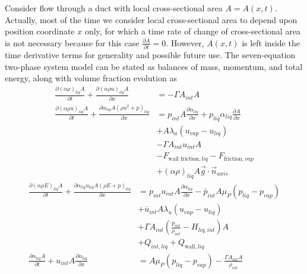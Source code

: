 Consider flow through a duct with local cross-sectional area
$A=A(x,t)$.  Actually, most of the time we consider local
cross-sectional area to depend upon position coordinate $x$ only,
for which a time rate of change of cross-sectional area is not
necessary because for this case $\frac{\partial A}{\partial
t} = 0$.  However, $A(x,t)$ is left inside the time derivative terms
for generality and possible future use.  The seven-equation two-phase
system model can be stated as balances of mass, momentum, and total energy,
along with volume fraction evolution as
\begin{align}
  \label{E-R:74}
  \frac{\partial \left( \alpha \rho \right)_{liq} A}{\partial t}
  + \frac{\partial \left( \alpha \rho u \right)_{liq} A}{\partial x}
  &= - \Gamma A_{int} A
  \\
  \nonumber
  \frac{\partial \left( \alpha \rho u \right)_{liq} A}{\partial t}
  + \frac{\partial \alpha_{liq} A \left( \rho u^2 + p \right)_{liq} }{\partial x}
  &= p_{int} A \frac{\partial \alpha_{liq}}{\partial x} + p_{liq} \alpha_{liq} \frac{\partial A}{\partial x}
  \\
  \nonumber
  &+ A \lambda_u (u_{vap} - u_{liq})
  \\
  \nonumber
  &- \Gamma A_{int} u_{int} A
  \\
  \nonumber
  &- F_{\text{wall friction}, liq} - F_{\text{friction}, vap}
  \\
  &+ \left( \alpha \rho \right)_{liq} A \vec{g} \cdot \vec{n}_{axis}
\end{align}
\begin{align}
  \nonumber
  \frac{\partial \left( \alpha \rho E \right)_{liq} A}{\partial t}
  + \frac{\partial \alpha_{liq} u_{liq} A \left( \rho E + p \right)_{liq}}{\partial x}
  &= p_{int} u_{int} A \frac{\partial \alpha_{liq}}{\partial x} - \bar{p}_{int} A \mu_P (p_{liq} - p_{vap})
  \\
  \nonumber
  &+ \bar{u}_{int} A \lambda_u (u_{vap} - u_{liq})
  \\
  \nonumber
  &+ \Gamma A_{int} \left( \frac{p_{int}}{\rho_{int}} - H_{liq, int} \right) A
  \\
  &+ Q_{int, liq} + Q_{\text{wall}, liq}
  \\
  \label{eqn:7eqn_va_alpha_liq}
  \frac{\partial \alpha_{liq} A}{\partial t} + u_{int} A \frac{\partial \alpha_{liq}}{\partial x}
  &= A \mu_P (p_{liq} - p_{vap}) - \frac{\Gamma A_{int} A}{\rho_{int}}
\end{align}

